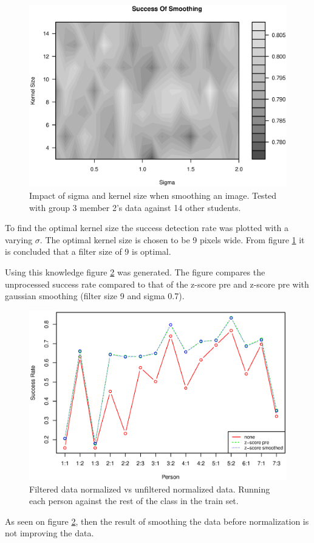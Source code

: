 \begin{figure}[H]
\centering
\includegraphics[width = \textwidth]{graphics/success_of_smoothing_contour}
\caption[Optimal smoothing]{Impact of sigma and kernel size when smoothing an image. 
Tested with group 3 member 2's data against 14 other students.
}
\label{fig:smoothing_contour}
\end{figure}

To find the optimal kernel size the success detection rate was plotted with a varying $\sigma$. 
The optimal kernel size is chosen to be 9 pixels wide.
From figure \ref{fig:smoothing_contour} it is concluded that a filter size of 9 is optimal.

Using this knowledge figure \ref{fig:normalization_test_with_smooth} was generated.
The figure compares the unprocessed success rate compared to that of the z-score pre and z-score pre with gaussian smoothing (filter size 9 and sigma 0.7).

 \begin{figure}[H]
 \centering
 \includegraphics[width = \textwidth]{graphics/graph_normalization_smoothed}
 \caption[Filtered and normalized data.]{Filtered data normalized vs unfiltered normalized data.
 Running each person against the rest of the class in the train set.
 }
 \label{fig:normalization_test_with_smooth}
 \end{figure}

As seen on figure \ref{fig:normalization_test_with_smooth}, then the result of smoothing the data before normalization is not improving the data.

